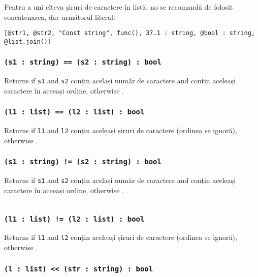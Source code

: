 Pentru a uni cîteva șiruri de caractere în listă, no se recomandă de folosit concatenarea, dar următorul literal:
\begin{verbatim}
[@str1, @str2, "Const string", func(), 37.1 : string, @bool : string, @list.join()]
\end{verbatim}

\subsubsection{\texttt{(s1 : string) == (s2 : string) : bool}}

Returns \true{} if \texttt{s1} and \texttt{s2} conțin același număr de caractere and conțin aceleași caractere în aceeași ordine, otherwise \false{}.

\subsubsection{\texttt{(l1 : list) == (l2 : list) : bool}}

Returns \true{} if \texttt{l1} and \texttt{l2} conțin aceleași șiruri de caractere (ordinea se ignoră), otherwise \false{}.

\subsubsection{\texttt{(s1 : string) != (s2 : string) : bool}}

Returns \false{} if \texttt{s1} and \texttt{s2} conțin același număr de caractere and conțin aceleași caractere în aceeași ordine, otherwise \true{}.

\begin{sourcecode}
    \label{stringlistopex}
    \inputminted[linenos]{icl}{../sources/stringlistopex.icL}
\end{sourcecode}

\subsubsection{\texttt{(l1 : list) != (l2 : list) : bool}}

Returns \false{} if \texttt{l1} and \texttt{l2} conțin aceleași șiruri de caractere (ordinea se ignoră), otherwise \true{}.

\subsubsection{\texttt{(l : list) << (str : string) : bool}}

